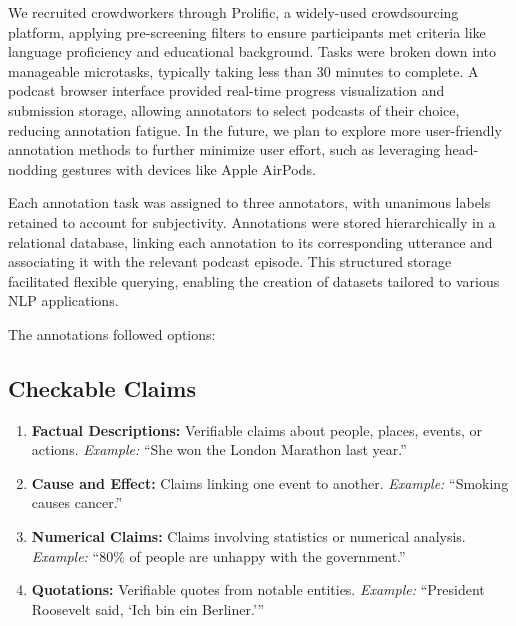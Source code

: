 We recruited crowdworkers through Prolific, a widely-used crowdsourcing platform, applying pre-screening filters to ensure participants met criteria like language proficiency and educational background. Tasks were broken down into manageable microtasks, typically taking less than 30 minutes to complete. A podcast browser interface provided real-time progress visualization and submission storage, allowing annotators to select podcasts of their choice, reducing annotation fatigue. In the future, we plan to explore more user-friendly annotation methods to further minimize user effort, such as leveraging head-nodding gestures with devices like Apple AirPods.

Each annotation task was assigned to three annotators, with unanimous labels retained to account for subjectivity. Annotations were stored hierarchically in a relational database, linking each annotation to its corresponding utterance and associating it with the relevant podcast episode. This structured storage facilitated flexible querying, enabling the creation of datasets tailored to various NLP applications.

The annotations followed options:

\subsection*{Checkable Claims}
\begin{enumerate}
    \item \textbf{Factual Descriptions:} Verifiable claims about people, places, events, or actions.  
    \textit{Example:} ``She won the London Marathon last year.''
    
    \item \textbf{Cause and Effect:} Claims linking one event to another.  
    \textit{Example:} ``Smoking causes cancer.''
    
    \item \textbf{Numerical Claims:} Claims involving statistics or numerical analysis.  
    \textit{Example:} ``80\% of people are unhappy with the government.''
    
    \item \textbf{Quotations:} Verifiable quotes from notable entities.  
    \textit{Example:} ``President Roosevelt said, `Ich bin ein Berliner.'''
\end{enumerate}

